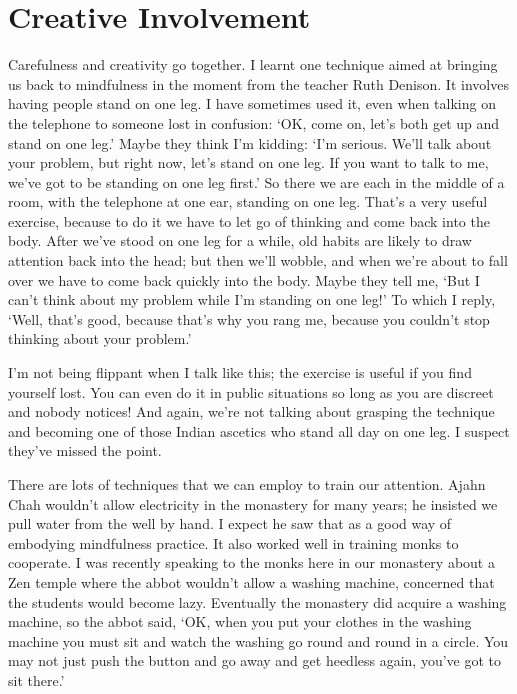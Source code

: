 \section{Creative Involvement}

Carefulness and creativity go together. I learnt one technique aimed at
bringing us back to mindfulness in the moment from the teacher Ruth
Denison. It involves having people stand on one leg. I have sometimes
used it, even when talking on the telephone to someone lost in
confusion: ‘OK, come on, let’s both get up and stand on one leg.’ Maybe
they think I’m kidding: ‘I’m serious. We’ll talk about your problem, but
right now, let’s stand on one leg. If you want to talk to me, we’ve got
to be standing on one leg first.’ So there we are each in the middle of
a room, with the telephone at one ear, standing on one leg. That’s a
very useful exercise, because to do it we have to let go of thinking and
come back into the body. After we’ve stood on one leg for a while, old
habits are likely to draw attention back into the head; but then we’ll
wobble, and when we’re about to fall over we have to come back quickly
into the body. Maybe they tell me, ‘But I can’t think about my problem
while I’m standing on one leg!’ To which I reply, ‘Well, that’s good,
because that’s why you rang me, because you couldn’t stop thinking about
your problem.’

I’m not being flippant when I talk like this; the exercise is useful if
you find yourself lost. You can even do it in public situations so long
as you are discreet and nobody notices! And again, we’re not talking
about grasping the technique and becoming one of those Indian ascetics
who stand all day on one leg. I suspect they’ve missed the point.

There are lots of techniques that we can employ to train our attention.
Ajahn Chah wouldn’t allow electricity in the monastery for many years;
he insisted we pull water from the well by hand. I expect he saw that as
a good way of embodying mindfulness practice. It also worked well in
training monks to cooperate. I was recently speaking to the monks here
in our monastery about a Zen temple where the abbot wouldn’t allow a
washing machine, concerned that the students would become lazy.
Eventually the monastery did acquire a washing machine, so the abbot
said, ‘OK, when you put your clothes in the washing machine you must sit
and watch the washing go round and round in a circle. You may not just
push the button and go away and get heedless again, you’ve got to sit
there.’

